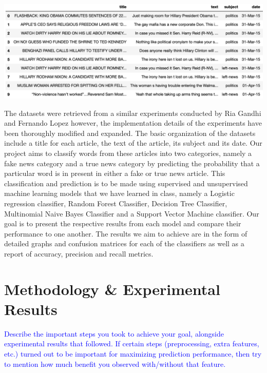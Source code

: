\documentclass[10pt,twocolumn,letterpaper]{article}
\begin{document}
\begin{center}
\includegraphics[width=\linewidth]{Latex_Report/report/Graphs/dt_example.png}
\end{center}

The datasets\cite{githubRia} \cite{githubFer} were retrieved from a similar experiments conducted by Ria Gandhi and Fernando Lopez \cite{Ria} \cite{Fernando} however, the implementation details of the experiments have been thoroughly modified and expanded. The basic organization of the datasets include a title for each article, the text of the article, its subject and its date. Our project aims to classify words from these articles into two categories, namely a fake news category and a true news category by predicting the probability that a particular word is in present in either a fake or true news article. This classification and prediction is to be made using supervised and unsupervised machine learning models that we have learned in class, namely a Logistic regression classifier, Random Forest Classifier, Decision Tree Classifier, Multinomial Naive Bayes Classifier and a Support Vector Machine classifier. Our goal is to present the respective results from each model and compare their performance to one another. The results we aim to achieve are in the form of detailed graphs and confusion matrices for each of the classifiers as well as a report of accuracy, precision and recall metrics. 


\section{Methodology \& Experimental Results}

\textcolor{blue}{Describe the important steps you took to achieve your goal, alongside experimental results that followed. If certain steps (preprocessing, extra features, etc.) turned out to be important for maximizing prediction performance, then try to mention how much benefit you observed with/without that feature.}
\end{document}
